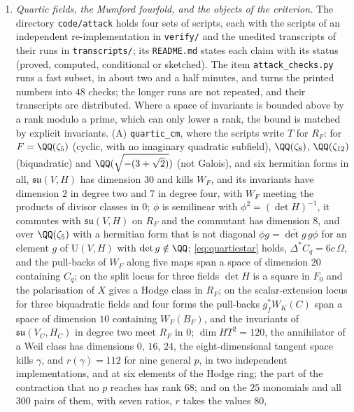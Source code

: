 \begin{enumerate}[label=\textup{(\Roman*)},leftmargin=*]
\item \emph{Quartic fields, the Mumford fourfold, and the objects of the
  criterion.} The directory \texttt{code/\allowbreak attack} holds four sets
  of scripts, each with the scripts of an independent re-implementation in
  \texttt{verify/} and the unedited transcripts of their runs in
  \texttt{transcripts/}; its \texttt{README.md} states each claim with its
  status (proved, computed, conditional or sketched). The item
  \texttt{attack\_\allowbreak checks.py} runs a fast subset, in about two and a
  half minutes, and turns the printed numbers into $48$ checks; the longer
  runs are not repeated, and their transcripts are distributed. Where a space
  of invariants is bounded above by a rank modulo a prime, which can only lower
  a rank, the bound is matched by explicit invariants. (A)
  \texttt{quartic\_\allowbreak cm}, where the scripts write $T$ for $R_{F}$:
  for $F=\QQ(\zeta_{5})$ (cyclic, with no imaginary quadratic subfield),
  $\QQ(\zeta_{8})$, $\QQ(\zeta_{12})$ (biquadratic) and
  $\QQ(\sqrt{-(3+\sqrt2)})$ (not Galois), and six hermitian forms in all,
  $\mathfrak{su}(V,H)$ has dimension $30$ and kills $W_{F}$, and its
  invariants have dimension $2$ in degree two and $7$ in degree four, with
  $W_{F}$ meeting the products of divisor classes in $0$; $\phi$ is
  semilinear with $\phi^{2}=(\det H)^{-1}$, it commutes with $\mathfrak{su}(V,H)$
  on $R_{F}$ and the commutant has dimension $8$, and over $\QQ(\zeta_{5})$
  with a hermitian form that is not diagonal $\phi g=\overline{\det g}\,g\phi$
  for an element $g$ of $\mathrm{U}(V,H)$ with $\det g\notin\QQ$;
  \eqref{eq:quarticstar} holds, $\Delta^{*}C_{q}=6c\,\Omega$, and the
  pull-backs of $W_{F}$ along five maps span a space of dimension $20$
  containing $C_{q}$; on the split locus for three fields $\det H$ is a square
  in $F_{0}$ and the polarisation of $X$ gives a Hodge class in $R_{F}$; on
  the scalar-extension locus for three biquadratic fields and four forms the
  pull-backs $g_{f}^{*}W_{K}(C)$ span a space of dimension $10$ containing
  $W_{F}(B_{F})$, and the invariants of $\mathfrak{su}(V_{C},H_{C})$ in degree
  two meet $R_{F}$ in $0$; $\dim HT^{2}=120$, the annihilator of a Weil class
  has dimensions $0$, $16$, $24$, the eight-dimensional tangent space kills
  $\gamma$, and $r(\gamma)=112$ for nine general $p$, in two independent
  implementations, and at six elements of the Hodge ring; the part of the
  contraction that no $p$ reaches has rank $68$; and on the $25$ monomials and
  all $300$ pairs of them, with seven ratios, $r$ takes the values $80$,

\end{enumerate}
